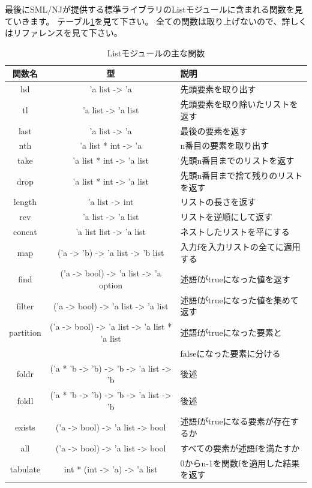 \documentclass[11pt,a4paper]{article}
\begin{document}
最後にSML/NJが提供する標準ライブラリのListモジュールに含まれる関数を見ていきます。
テーブル\ref{fig:list-table}を見て下さい。
全ての関数は取り上げないので、詳しくはリファレンスを見て下さい\cite{sml-libs}。

\begin{table}[htbp]
  \begin{tabular}{|c|c|l|}
\hline
関数名 & 型 & 説明 \\ \hline \hline
hd & 'a list -> 'a                                         & 先頭要素を取り出す\\ \hline
tl & 'a list -> 'a list                                    & 先頭要素を取り除いたリストを返す\\ \hline
last & 'a list -> 'a                                       & 最後の要素を返す\\ \hline
nth & 'a list * int -> 'a                                  & n番目の要素を取り出す\\ \hline
take & 'a list * int -> 'a list                            & 先頭n番目までのリストを返す\\ \hline
drop & 'a list * int -> 'a list                            & 先頭n番目まで捨て残りのリストを返す\\ \hline
length & 'a list -> int                                    & リストの長さを返す\\ \hline
rev & 'a list -> 'a list                                   & リストを逆順にして返す\\ \hline
concat & 'a list list -> 'a list                           & ネストしたリストを平にする\\ \hline
map & ('a -> 'b) -> 'a list -> 'b list                     & 入力fを入力リストの全てに適用する\\ \hline
find & ('a -> bool) -> 'a list -> 'a option                & 述語fがtrueになった値を返す\\ \hline
filter & ('a -> bool) -> 'a list -> 'a list                & 述語fがtrueになった値を集めて返す\\ \hline
partition & ('a -> bool) -> 'a list -> 'a list * 'a list   & 述語fがtrueになった要素と\\
          &                                                & falseになった要素に分ける\\ \hline
foldr & ('a * 'b -> 'b) -> 'b -> 'a list -> 'b             & 後述\\ \hline
foldl & ('a * 'b -> 'b) -> 'b -> 'a list -> 'b             & 後述\\ \hline
exists & ('a -> bool) -> 'a list -> bool                   & 述語fがtrueになる要素が存在するか\\ \hline
all & ('a -> bool) -> 'a list -> bool                      & すべての要素が述語fを満たすか\\ \hline
tabulate & int * (int -> 'a) -> 'a list                    & 0からn-1を関数fを適用した結果を返す\\ \hline
  \end{tabular}
  \caption{Listモジュールの主な関数}
  \label{fig:list-table}
\end{table}
\end{document}
